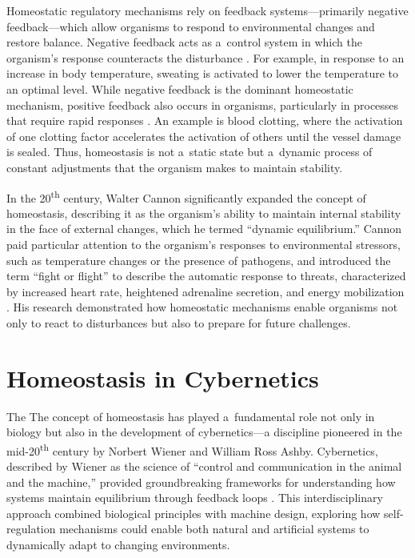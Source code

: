 Homeostatic regulatory mechanisms rely on feedback systems---primarily negative feedback---which allow organisms to respond to environmental changes and restore balance. Negative feedback acts as a~control system in which the organism's response counteracts the disturbance 
\parencites[][]{perrimon_negative_1999}[][]{bielecki_cybernetic_2016}[][]{hancock_interplay_2017}. %
 For example, in response to an increase in body temperature, sweating is activated to lower the temperature to an optimal level. While negative feedback is the dominant homeostatic mechanism, positive feedback also occurs in organisms, particularly in processes that require rapid responses 
\parencite[][]{peters_principle_2007}. %
 An example is blood clotting, where the activation of one clotting factor accelerates the activation of others until the vessel damage is sealed. Thus, homeostasis is not a~static state but a~dynamic process of constant adjustments that the organism makes to maintain stability.~



In the 20\textsuperscript{th} century, Walter Cannon significantly expanded the concept of homeostasis, describing it as the organism's ability to maintain internal stability in the face of external changes, which he termed ``dynamic equilibrium.'' Cannon paid particular attention to the organism's responses to environmental stressors, such as temperature changes or the presence of pathogens, and introduced the term ``fight or flight'' to describe the automatic response to threats, characterized by increased heart rate, heightened adrenaline secretion, and energy mobilization 
\parencite[][]{modell_physiologists_2015}. %
 His research demonstrated how homeostatic mechanisms enable organisms not only to react to disturbances but also to prepare for future challenges.~



\section*{Homeostasis in Cybernetics~}

The The concept of homeostasis has played a~fundamental role not only in biology but also in the development of cybernetics---a discipline pioneered in the mid-20\textsuperscript{th} century by Norbert Wiener and William Ross Ashby. Cybernetics, described by Wiener as the science of ``control and communication in the animal and the machine,'' provided groundbreaking frameworks for understanding how systems maintain equilibrium through feedback loops 
\parencite[][]{wiener_cybernetics_1965}. %
 This interdisciplinary approach combined biological principles with machine design, exploring how self-regulation mechanisms could enable both natural and artificial systems to dynamically adapt to changing environments.



